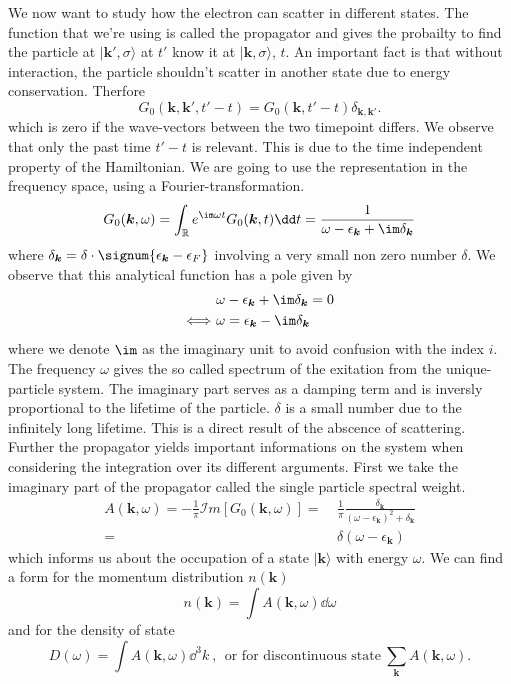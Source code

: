 \documentclass[../main.tex]{subfile}
\begin{document}
We now want to study how the electron can scatter in different states. The function that we're using is called the propagator and
gives the probailty to find the particle at $|\bm{k}',\sigma\rangle$ at $t'$ know it at  $|\bm{k},\sigma\rangle$, $t$. 
An important fact is that without interaction, the particle shouldn't scatter in another state due to energy conservation. Therfore
\[
    G_0(\bm{k}, \bm{k}', t'-t) = G_0(\bm{k}, t'-t) \delta_{\bm{k}, \bm{k}'}.
\]
which is zero if the wave-vectors between the two timepoint differs. 
We observe that only the past time $t'-t$ is relevant. This is due to the time independent property of the Hamiltonian.
We are going to use the representation in the frequency space, using a Fourier-transformation.
\begin{equation}
    G_0(\bm{k},\omega) = \int_{\mathbb{R}} e^{\im\omega t} G_0(\bm{k},t)\dd t = \frac{1}{\omega - \epsilon_{\bm{k}} + \im \delta_{\bm{k}}} \label{eq:single_propa}
\end{equation}
where $\delta_{\bm{k}} = \delta \cdot\signum{\epsilon_{\bm{k}} - \epsilon_{F}}$ involving a very small non zero number $\delta$. We observe that
this analytical function has a pole given by 
\begin{align*}
    &\omega - \epsilon_{\bm{k}} + \im \delta_{\bm{k}} = 0\\
    \Longleftrightarrow ~& \omega = \epsilon_{\bm{k}} - \im \delta_{\bm{k}}
\end{align*}
where we denote $\im$ as the imaginary unit to avoid confusion with the index $i$.
The frequency $\omega$ gives the so called spectrum of the exitation from the unique-particle system. The imaginary part serves as a damping term and is 
inversly proportional to the lifetime of the particle. $\delta$ is a small number due to the infinitely long lifetime. This is a direct result of the abscence
of scattering.\\

Further the propagator yields important informations on the system when considering the integration over its different arguments. First we take the imaginary 
part of the propagator called the single particle spectral weight.
\begin{equation}\label{eq:SingleParticleSpectralWeight}
    \begin{aligned}
        A(\bm{k}, \omega) = -\frac{1}{\pi} \mathcal{I}m \left[G_0(\bm{k}, \omega)\right] =~& \frac{1}{\pi} \frac{\delta_{\bm{k}}}{(\omega- \epsilon_{\bm{k}})^2 + \delta_{\bm{k}}}\\
        =~&\delta(\omega- \epsilon_{\bm{k}})
    \end{aligned}
\end{equation}
which informs us about the occupation of a state $|\bm{k}\rangle$ with energy $\omega$. We can find a form for the momentum distribution $n(\bm{k})$
\[
    n(\bm{k}) = \int A(\bm{k},\omega) \dd \omega
\]
and for the density of state
\begin{equation}\label{eq:DensityOfState}
    D(\omega) = \int A(\bm{k},\omega) \dd ^3 k~,~~ \text{or for discontinuous state}~ \sum_{\bm{k}} A(\bm{k}, \omega).
\end{equation}
\end{document}
